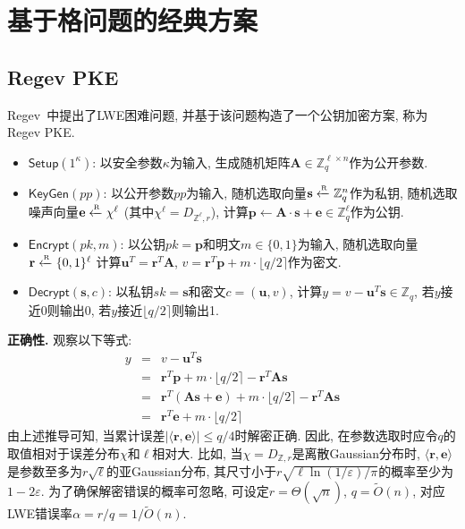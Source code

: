 \section{基于格问题的经典方案}
\subsection{Regev PKE}
Regev~\cite{Regev-STOC-2005}中提出了LWE困难问题, 并基于该问题构造了一个公钥加密方案, 称为Regev PKE. 

\begin{definition}
\begin{itemize}
\item $\mathsf{Setup}(1^\kappa)$: 以安全参数$\kappa$为输入, 生成随机矩阵$\mathbf{A} \in \mathbb{Z}_q^{\ell \times n}$作为公开参数. 

\item $\mathsf{KeyGen}(pp)$: 以公开参数$pp$为输入, 随机选取向量$\mathbf{s} \xleftarrow{\textup{\tiny R}} \mathbb{Z}_q^n$作为私钥, 
	随机选取噪声向量$\mathbf{e} \xleftarrow{\textup{\tiny R}} \chi^\ell$ (其中$\chi^\ell = D_{\mathbb{Z}^\ell, r}$), 
    计算$\mathbf{p} \leftarrow \mathbf{A} \cdot \mathbf{s} + \mathbf{e} \in \mathbb{Z}_q^\ell$作为公钥. 

\item $\mathsf{Encrypt}(pk, m)$: 以公钥$pk = \mathbf{p}$和明文$m \in \{0,1\}$为输入, 
	随机选取向量$\mathbf{r} \xleftarrow{\textup{\tiny R}} \{0,1\}^\ell$
	计算$\mathbf{u}^T = \mathbf{r}^T \mathbf{A}$, $v = \mathbf{r}^T \mathbf{p} + m \cdot \lfloor q/2 \rceil$作为密文. 

\item $\mathsf{Decrypt}(\mathbf{s}, c)$: 以私钥$sk = \mathbf{s}$和密文$c = (\mathbf{u}, v)$, 
    计算$y = v - \mathbf{u}^T\mathbf{s} \in \mathbb{Z}_q$, 若$y$接近0则输出0, 
    若$y$接近$\lfloor q/2 \rceil$则输出1.    
\end{itemize}
\end{definition}

\begin{trivlist}
\item \textbf{正确性.} 观察以下等式: 
\begin{eqnarray*}
y &=& v - \mathbf{u}^T\mathbf{s}\\
  &=& \mathbf{r}^T \mathbf{p} + m \cdot \lfloor q/2 \rceil - \mathbf{r}^T \mathbf{A} \mathbf{s}\\
  &=& \mathbf{r}^T (\mathbf{A} \mathbf{s}+\mathbf{e}) + m \cdot \lfloor q/2 \rceil - \mathbf{r}^T \mathbf{A}\mathbf{s}\\
  &=& \mathbf{r}^T\mathbf{e}+m \cdot \lfloor q/2 \rceil
\end{eqnarray*}
由上述推导可知, 当累计误差$|\langle \mathbf{r}, \mathbf{e} \rangle|\leq q/4$时解密正确. 
因此, 在参数选取时应令$q$的取值相对于误差分布$\chi$和$\ell$相对大. 比如, 当$\chi = D_{\mathbb{Z}, r}$是离散Gaussian分布时, 
$\langle \mathbf{r}, \mathbf{e} \rangle$是参数至多为$r \sqrt{\ell}$的亚Gaussian分布, 
其尺寸小于$r \sqrt{\ell \ln (1/\varepsilon)/\pi}$的概率至少为$1-2\varepsilon$.  
为了确保解密错误的概率可忽略, 可设定$r = \Theta(\sqrt{n})$, $q = \tilde{O}(n)$, 对应LWE错误率$\alpha = r/q = 1/\tilde{O}(n)$. 
\end{trivlist}

